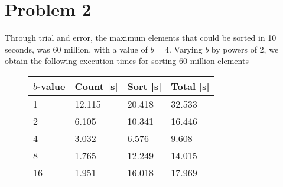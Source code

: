 \documentclass{article}
\begin{document}
\newpage
\section*{Problem 2}

Through trial and error, the maximum elements that could be sorted in 10 seconds, was 60 million, with a value of \( b = 4 \). Varying \( b \) by powers of 2, we obtain the following execution times for sorting 60 million elements


\testdata

\begin{figure}[H]
    \begin{table}[H]
        \begin{center}
            \begin{tabular}[h]{|l|l|l|l|} \hline
                \( b \)-value&Count [s]&Sort [s] &Total [s] \\
                \hline
                1& 12.115&  20.418 & 32.533\\
                \hline
2& 6.105&  10.341 & 16.446\\
                \hline
4& 3.032&  6.576 & 9.608\\
                \hline
8& 1.765&  12.249 & 14.015\\
                \hline
16& 1.951&  16.018 & 17.969\\
                \hline
            \end{tabular}
        \end{center}
    \end{table}
\end{figure}
\end{document}

